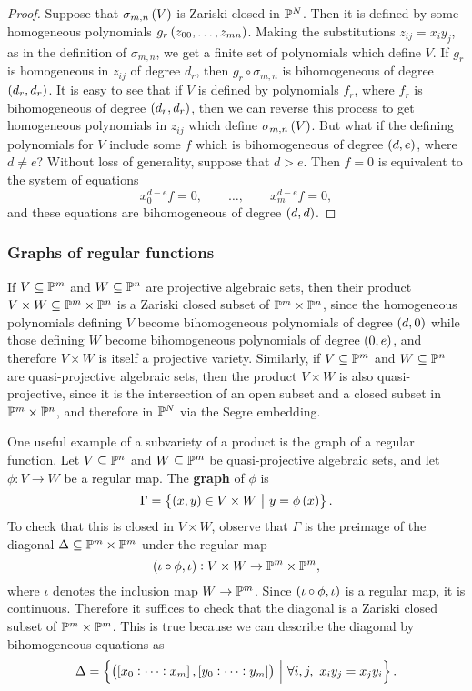 \begin{proof}
Suppose that $ \sigma_{m, n}\br{V} $ is Zariski closed in $ \mathbb{P}^N $. Then it is defined by some homogeneous polynomials $ g_r\br{z_{00}, \dots, z_{mn}} $. Making the substitutions $ z_{ij} = x_iy_j $, as in the definition of $ \sigma_{m, n} $, we get a finite set of polynomials which define $ V $. If $ g_r $ is homogeneous in $ z_{ij} $ of degree $ d_r $, then $ g_r \circ \sigma_{m, n} $ is bihomogeneous of degree $ \br{d_r, d_r} $. It is easy to see that if $ V $ is defined by polynomials $ f_r $, where $ f_r $ is bihomogeneous of degree $ \br{d_r, d_r} $, then we can reverse this process to get homogeneous polynomials in $ z_{ij} $ which define $ \sigma_{m, n}\br{V} $. But what if the defining polynomials for $ V $ include some $ f $ which is bihomogeneous of degree $ \br{d, e} $, where $ d \ne e $? Without loss of generality, suppose that $ d > e $. Then $ f = 0 $ is equivalent to the system of equations
$$ x_0^{d - e}f = 0, \qquad \dots, \qquad x_m^{d - e}f = 0, $$
and these equations are bihomogeneous of degree $ \br{d, d} $.
\end{proof}

\subsubsection{Graphs of regular functions}

If $ V \subseteq \mathbb{P}^m $ and $ W \subseteq \mathbb{P}^n $ are projective algebraic sets, then their product $ V \times W \subseteq \mathbb{P}^m \times \mathbb{P}^n $ is a Zariski closed subset of $ \mathbb{P}^m \times \mathbb{P}^n $, since the homogeneous polynomials defining $ V $ become bihomogeneous polynomials of degree $ \br{d, 0} $ while those defining $ W $ become bihomogeneous polynomials of degree $ \br{0, e} $, and therefore $ V \times W $ is itself a projective variety. Similarly, if $ V \subseteq \mathbb{P}^m $ and $ W \subseteq \mathbb{P}^n $ are quasi-projective algebraic sets, then the product $ V \times W $ is also quasi-projective, since it is the intersection of an open subset and a closed subset in $ \mathbb{P}^m \times \mathbb{P}^n $, and therefore in $ \mathbb{P}^N $ via the Segre embedding.

\begin{example*}
One useful example of a subvariety of a product is the graph of a regular function. Let $ V \subseteq \mathbb{P}^n $ and $ W \subseteq \mathbb{P}^m $ be quasi-projective algebraic sets, and let $ \phi : V \to W $ be a regular map. The \textbf{graph} of $ \phi $ is
$$ \Gamma = \cbr{\br{x, y} \in V \times W \st y = \phi\br{x}}. $$
To check that this is closed in $ V \times W $, observe that $ \Gamma $ is the preimage of the diagonal $ \Delta \subseteq \mathbb{P}^m \times \mathbb{P}^m $ under the regular map
$$ \br{\iota \circ \phi, \iota} : V \times W \to \PP^m \times \PP^m, $$
where $ \iota $ denotes the inclusion map $ W \to \mathbb{P}^m $. Since $ \br{\iota \circ \phi, \iota} $ is a regular map, it is continuous. Therefore it suffices to check that the diagonal is a Zariski closed subset of $ \mathbb{P}^m \times \mathbb{P}^m $. This is true because we can describe the diagonal by bihomogeneous equations as
$$ \Delta = \cbr{\br{\sbr{x_0 : \dots : x_m}, \sbr{y_0 : \dots : y_m}} \st \forall i, j, \ x_iy_j = x_jy_i}. $$
\end{example*}

